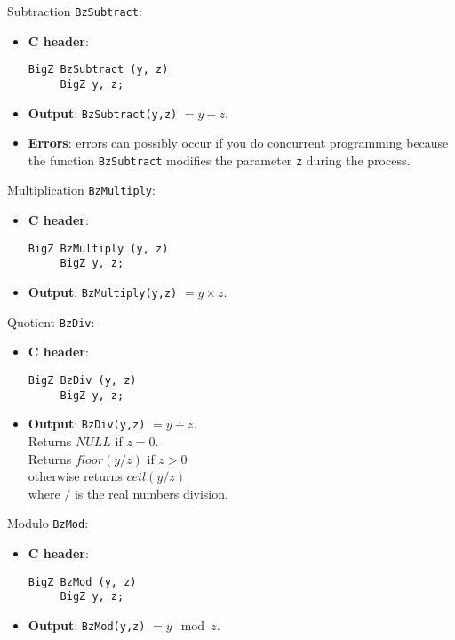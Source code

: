  
\begin{func}  Subtraction \verb+BzSubtract+:
\begin{itemize}
  \item{\bf C header}:
\begin{verbatim}
BigZ BzSubtract (y, z)  
     BigZ y, z;
\end{verbatim}
  \item{\bf Output}: \verb+BzSubtract(y,z)+ $= y-z   $.
  \item {\bf Errors}: errors can possibly occur if you do concurrent programming
  because the function \verb+BzSubtract+ modifies the parameter \verb+z+ 
  during the process.
\end{itemize}
\end{func}
 
 
\begin{func} Multiplication  \verb+BzMultiply+:
\begin{itemize}
  \item{\bf C header}:
\begin{verbatim}
BigZ BzMultiply (y, z)
     BigZ y, z;
\end{verbatim}
  \item{\bf Output}: \verb+BzMultiply(y,z)+ $= y \times z  $.
\end{itemize}
\end{func}
 
 
\begin{func}  Quotient  \verb+BzDiv+:
\begin{itemize}
  \item{\bf C header}:
\begin{verbatim}
BigZ BzDiv (y, z)
     BigZ y, z;
\end{verbatim}
  \item{\bf Output}: \verb+BzDiv(y,z)+ $= y \div z  $.\\
    Returns $NULL$ if $z = 0$. \\
    Returns $floor(y/z)$ if $z > 0$\\
    otherwise returns $ceil(y/z)$\\
    where $/$ is the real numbers division.
\end{itemize}
\end{func}
 
 
\begin{func} Modulo  \verb+BzMod+:
\begin{itemize}
  \item{\bf C header}:
\begin{verbatim}
BigZ BzMod (y, z)
     BigZ y, z;
\end{verbatim}
  \item{\bf Output}: \verb+BzMod(y,z)+ $= y \mod z  $.
\end{itemize}
\end{func}
 

